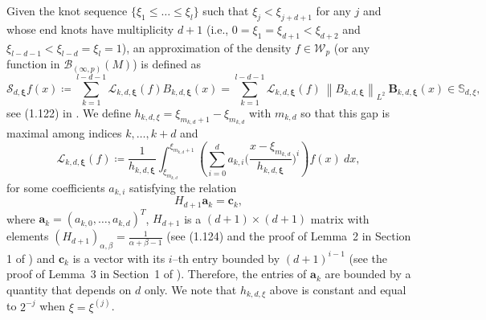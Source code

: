 \documentclass[preprint]{imsart}
\newcommand\norm[1]{\left\lVert#1\right\rVert}
\numberwithin{equation}{section}
\begin{document}
Given the knot sequence $\{\xi_1\leq\dots\leq\xi_{l}\}$ such that $\xi_j<\xi_{j+d+1}$ for any $j$ and whose end knots have multiplicity $d+1$ (i.e., $0=\xi_1=\xi_{d+1}<\xi_{d+2}$ and $\xi_{l-d-1}<\xi_{l-d}=\xi_{l}=1$), an approximation of the density $f\in\mathcal{W}_p$ (or any function in $\mathcal{B}_{(\infty,p)}(M)$) is defined as
\[
\mathcal{S}_{d,\mathbf{\xi}}f(x)\coloneqq \sum_{k=1}^{l-d-1} \mathcal{L}_{k,d,\mathbf{\xi}}(f)B_{k,d,\mathbf{\xi}}(x) = \sum_{k=1}^{l-d-1} \mathcal{L}_{k,d,\mathbf{\xi}}(f)\ \norm{B_{k,d,\mathbf{\xi}}}_{L^2}\ \mathbf{B}_{k,d,\mathbf{\xi}}(x)\in\mathbb{S}_{d,\xi},
\]
see (1.122) in \cite{LycheSpline}. We define $h_{k,d,\xi}=\xi_{m_{k,d}+1}-\xi_{m_{k,d}}$ with $m_{k,d}$ so that this gap is maximal among indices $k,\dots,k+d$ and 
\[
\mathcal{L}_{k,d,\mathbf{\xi}}(f)\coloneqq \frac{1}{h_{k,d,\mathbf{\xi}}}\int_{\xi_{m_{k,d}}}^{\xi_{m_{k,d}+1}} \left(\sum_{i=0}^da_{k,i}\Big(\frac{x-\xi_{m_{k,d}}}{h_{k,d,\mathbf{\xi}}}\Big)^i\right)f(x)\ dx,
\]
for some coefficients $a_{k,i}$ satisfying the relation 
\[
H_{d+1}\mathbf{a}_k = \mathbf{c}_k,
\]
where $\mathbf{a}_k=(a_{k,0},\dots,a_{k,d})^T$, $H_{d+1}$ is a $(d+1)\times(d+1)$ matrix with elements $(H_{d+1})_{\alpha,\beta}=\frac{1}{\alpha+\beta-1}$ (see (1.124) and the proof of Lemma~2 in Section 1 of \cite{LycheSpline}) and $\mathbf{c}_k$ is a vector with its $i$--th entry bounded by $(d+1)^{i-1}$ (see the proof of Lemma~3 in Section~1 of \cite{LycheSpline}). Therefore, the entries of $\mathbf{a}_k$ are bounded by a quantity that depends on $d$ only. We note that $h_{k,d,\xi}$ above is constant and equal to $2^{-j}$ when $\xi=\xi^{(j)}$.
\end{document}
